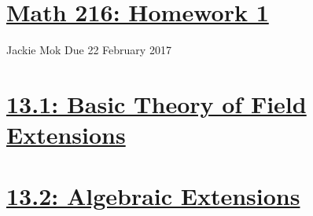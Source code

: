 \documentclass{article}
\begin{document}
\section*{\underline{Math 216: Homework 1}}
Jackie Mok
\newline Due 22 February 2017

\section*{\underline{13.1: Basic Theory of Field Extensions}}





\section*{\underline{13.2: Algebraic Extensions}}








\end{document}
